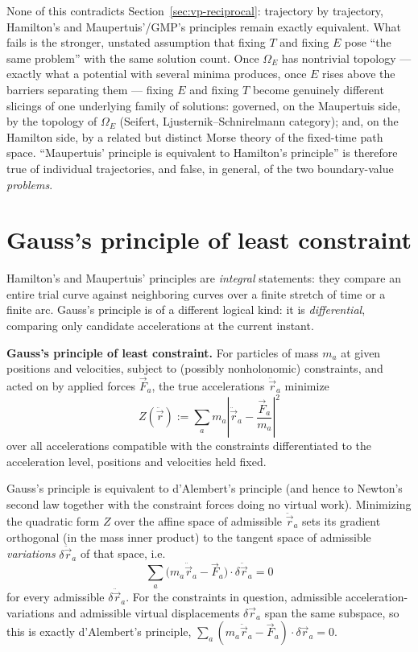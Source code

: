 None of this contradicts Section~\ref{sec:vp-reciprocal}: trajectory by
trajectory, Hamilton's and Maupertuis'/GMP's principles remain exactly
equivalent. What fails is the stronger, unstated assumption that fixing $T$ and
fixing $E$ pose ``the same problem'' with the same solution count. Once
$\Omega_E$ has nontrivial topology --- exactly what a potential with several
minima produces, once $E$ rises above the barriers separating them --- fixing
$E$ and fixing $T$ become genuinely different slicings of one underlying family
of solutions: governed, on the Maupertuis side, by the topology of $\Omega_E$
(Seifert, Ljusternik--Schnirelmann category); and, on the Hamilton side, by a
related but distinct Morse theory of the fixed-time path space. ``Maupertuis'
principle is equivalent to Hamilton's principle'' is therefore true of
individual trajectories, and false, in general, of the two boundary-value
\emph{problems}.

\section{Gauss's principle of least constraint}
\label{sec:vp-gauss}

Hamilton's and Maupertuis' principles are \emph{integral} statements: they
compare an entire trial curve against neighboring curves over a finite stretch
of time or a finite arc. Gauss's principle is of a different logical kind: it
is \emph{differential}, comparing only candidate accelerations at the current
instant.

\begin{definition}
\textbf{Gauss's principle of least constraint.} For particles of mass $m_a$ at
    given positions and velocities, subject to (possibly nonholonomic)
    constraints, and acted on by applied forces $\vec F_a$, the true
    accelerations $\ddot{\vec r}_a$ minimize
\[
Z(\ddot{\vec r}) := \sum_a m_a\left|\ddot{\vec r}_a 
    - \frac{\vec F_a}{m_a}\right|^2
\]
over all accelerations compatible with the constraints differentiated to the
    acceleration level, positions and velocities held fixed.
\end{definition}

Gauss's principle is equivalent to d'Alembert's principle (and hence to
Newton's second law together with the constraint forces doing no virtual work).
Minimizing the quadratic form $Z$ over the affine space of admissible
$\ddot{\vec r}_a$ sets its gradient orthogonal (in the mass inner product) to
the tangent space of admissible \emph{variations} $\delta\ddot{\vec r}_a$ of
that space, i.e.
\[
\sum_a \big(m_a\ddot{\vec r}_a - \vec F_a\big)\cdot \delta\ddot{\vec r}_a = 0
\]
for every admissible $\delta \ddot{\vec r}_a$. For the constraints in question,
admissible acceleration-variations and admissible virtual displacements $\delta
\vec r_a$ span the same subspace, so this is exactly d'Alembert's principle,
$\sum_a(m_a\ddot{\vec r}_a-\vec F_a)\cdot\delta\vec r_a=0$.

